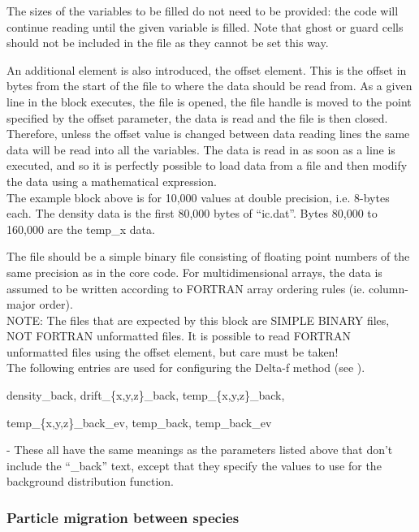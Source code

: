 The sizes of the variables to be filled do not need to be provided: the
code will continue reading until the given variable is filled. 
Note that ghost or guard cells should not be included in the file as
they cannot be set this way. 

An additional element is also introduced, the offset element. This
is the offset in bytes from the start of the file to where the data should
be read from. As a given line in the block executes, the file is opened, the
file handle is moved to the point specified by the offset parameter, the data
is read and the file is then closed. Therefore, unless the offset value is
changed between data reading lines the same data will be read into all the
variables. The data is read in as soon as a line is executed, and so it is
perfectly possible to load data from a file and then modify the data using
a mathematical expression.\\

The example block above is for 10,000 values at double precision, i.e. 8-bytes
each. The density data is the first 80,000 bytes of ``ic.dat''. Bytes 80,000
to 160,000 are the temp\_x data.

The file should be a simple binary file consisting of floating point numbers of
the same precision as  in the core {\EPOCH} code. For
multidimensional arrays, the data is assumed to be written according to
FORTRAN array ordering rules (ie. column-major order).\\

{\emphtext NOTE: The files that are expected by this block are SIMPLE BINARY
files, NOT FORTRAN unformatted files. It is possible to read FORTRAN
unformatted files using the offset element, but care must be taken!}\\

The following entries are used for configuring the Delta-f method
(see ).\\

{\emphtext density\_back, drift\_\{x,y,z\}\_back, temp\_\{x,y,z\}\_back,
\par temp\_\{x,y,z\}\_back\_ev, temp\_back, temp\_back\_ev}
 - These all have the same
meanings as the parameters listed above that don't include the ``\_back'' text,
except that they specify the values to use for the background distribution
function.\\

\subsubsection{Particle migration between species}
\label{sec:migration}

